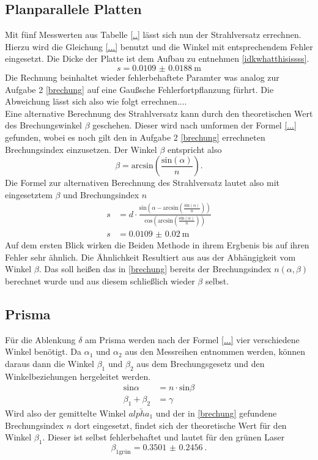 \subsection{Planparallele Platten}
Mit fünf Messwerten aus Tabelle \ref{..} lässt sich nun der Strahlversatz errechnen. Hierzu wird die Gleichung \eqref{...}
benutzt und die Winkel mit entsprechendem Fehler eingesetzt. Die Dicke der Platte ist dem Aufbau zu entnehmen \ref{idkwhatthisissss}.
\begin{equation*}
    s = \SI{0.0109(00188)}{\meter}
\end{equation*}
Die Rechnung beinhaltet wieder fehlerbehaftete Paramter was analog zur Aufgabe 2 \ref{brechung} auf eine Gaußsche Fehlerfortpflanzung 
fürhrt. Die Abweichung lässt sich also wie folgt errechnen....
\\

Eine alternative Berechnung des Strahlversatz kann durch den theoretischen Wert des Brechungswinkel $\beta$ geschehen. 
Dieser wird nach umformen der Formel \eqref{...} gefunden, wobei es noch gilt den in Aufgabe 2 \ref{brechung} errechneten Brechungsindex
einzusetzen. Der Winkel $\beta$ entspricht also
\begin{equation*}
    \beta  = \text{arcsin} \left( \frac{\text{sin}(\alpha)}{n}\right).
\end{equation*}
Die Formel zur alternativen Berechnung des Strahlversatz lautet also mit eingesetztem $\beta$ und Brechungsindex $n$
\begin{align*}
    s &= d  \cdot \frac{\text{sin} \left (  \alpha- \text{arcsin} \left( \frac{\text{sin}(\alpha)}{n}\right) \right)} {\text{cos}\left(\text{arcsin} \left( \frac{\text{sin}(\alpha)}{n}\right)\right)}\\
    s &= \SI{0.0109(00200)}{\meter}
\end{align*}
Auf dem ersten Blick wirken die Beiden Methode in ihrem Ergbenis bis auf ihren Fehler sehr ähnlich. Die Ähnlichkeit Resultiert aus 
aus der Abhängigkeit vom Winkel $\beta$. Das soll heißen das in \ref{brechung} bereits der Brechungsindex $n(\alpha, \beta)$
berechnet wurde und aus diesem schließlich wieder $\beta$ selbst. 

\subsection{Prisma}
Für die Ablenkung $\delta$ am Prisma werden nach der Formel \eqref{...} vier verschiedene Winkel benötigt. 
Da $\alpha_1$ und $\alpha_2$  aus den Messreihen entnommen werden, können daraus dann die Winkel $\beta_1$ und $\beta_2$ aus dem Brechungsgesetz und den Winkelbeziehungen hergeleitet werden.
\begin{align*}
    \text{sin}\alpha &= n \cdot \text{sin}\beta \\
    \beta_1 + \beta_2 &= \gamma
\end{align*}
Wird also der gemittelte Winkel $\bar{alpha_1}$ und der in \ref{brechung} gefundene Brechungsindex $n$ dort eingesetzt, findet
sich der theoretische Wert für den Winkel $\beta_1$. Dieser ist selbst fehlerbehaftet und lautet für den grünen Laser
\begin{equation}
   \beta_{1\text{grün}} = \SI{0.3501(02456)}{}.
\end{equation}
